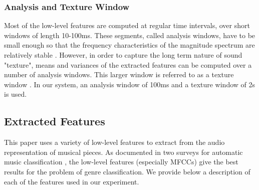 \documentclass[a4paper,11pt,oneside]{article}
\begin{document}
\subsubsection*{Analysis and Texture Window}
Most of the low-level features are computed at regular time intervals, over short windows of length 10-100ms.
These segments, called analysis windows, have to be small enough so that the frequency characteristics
of the magnitude spectrum are relatively stable \cite{tzan}. However, in order to capture the long term nature 
of sound "texture", means and variances of the extracted features can be computed over a number of analysis windows.
This larger window is referred to as a texture window \cite{tzan}. In our system, an analysis window of 100ms and a 
texture window of 2s is used.
\subsection{Extracted Features}\label{exft}
This paper uses a variety of low-level features to extract from the audio representation of musical pieces.
As documented in two surveys for automatic music classification \cite{survey1,survey2}, the low-level
features (especially MFCCs) give the best results for the problem of genre classification. We provide below
a description of each of the features used in our experiment.
\end{document}
